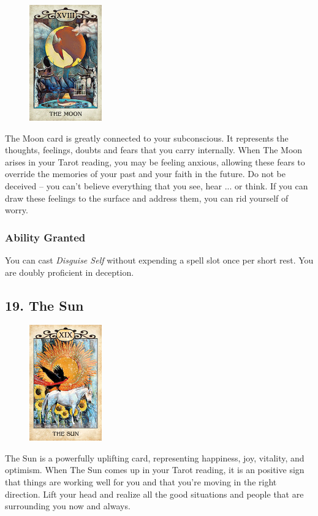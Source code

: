 \documentclass[10pt,twoside,twocolumn,openany,nodeprecatedcode]{dndbook}
\begin{document}
    \begin{figure}
        \includegraphics[height=5cm,width=\linewidth]{moon.jpg}
    \end{figure}
    The Moon card is greatly connected to your subconscious. It represents the thoughts, feelings, doubts and fears that you carry internally. When The Moon arises in your Tarot reading, you may be feeling anxious, allowing these fears to override the memories of your past and your faith in the future. Do not be deceived -- you can't believe everything that you see, hear ... or think. If you can draw these feelings to the surface and address them, you can rid yourself of worry.

    \subsubsection*{Ability Granted}
    You can cast \emph{Disguise Self} without expending a spell slot once per short rest. You are doubly proficient in deception.

    \newpage

    \subsection*{19. The Sun}

    \begin{figure}
        \includegraphics[height=5cm,width=\linewidth]{sun.jpg}
    \end{figure}
    The Sun is a powerfully uplifting card, representing happiness, joy, vitality, and optimism. When The Sun comes up in your Tarot reading, it is an positive sign that things are working well for you and that you're moving in the right direction. Lift your head and realize all the good situations and people that are surrounding you now and always. 
\end{document}
